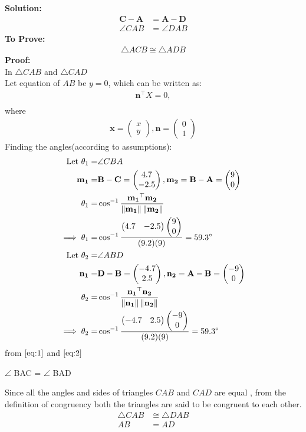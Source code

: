 \documentclass{article}
\providecommand{\norm}[1]{\left\lVert#1\right\rVert}
\newcommand{\solution}{\noindent \textbf{Solution: }}
\newcommand{\myvec}[1]{\ensuremath{\begin{pmatrix}#1\end{pmatrix}}}
\let\vec\mathbf
\begin{document}
\solution
\begin{align}
	\vec{C}-\vec{A} &= \vec{A}-\vec{D}\\
	\angle{CAB} &= \angle{DAB}
\end{align}
\textbf{To Prove:}
	\begin{align}
		\triangle{ACB} \cong \triangle{ADB}
	\end{align}
\textbf{Proof:}\\
In $\triangle{CAB}$ and $\triangle{CAD}$\\
Let  equation of $AB$ be $y = 0$, which can be written as:
\begin{align}
\vec{n}^{\top}X = 0,\\
\end{align}
where
\begin{align}
\vec{x} = \myvec{x\\y},\vec{n} = \myvec{0\\1}
\end{align}
	Finding the angles(according to assumptions):
		\begin{align}
\text{Let }\theta_1=&\angle CBA\\
\vec{m_1}=&\vec{B}-\vec{C}=\myvec{4.7\\-2.5}, \vec{m_2}=\vec{B}-\vec{A}=\myvec{9\\0}\\
\theta_1=&\cos^{-1}\frac{\vec{m_1}^\top\vec{m_2}}{\norm{\vec{m_1}}\norm{\vec{m_2}}}\\
\implies\theta_1=&\cos^{-1}\frac{\myvec{4.7&-2.5}\myvec{9\\0}}{(9.2)(9)}=59.3\degree
\label{eq:1}\\
\text{Let }\theta_2=&\angle ABD\\
\vec{n_1}=&\vec{D}-\vec{B}=\myvec{-4.7\\2.5}, \vec{n_2}=\vec{A}-\vec{B}=\myvec{-9\\0}\\
\theta_2 =& \cos^{-1}\frac{\vec{n_1}^\top\vec{n_2}}{\norm{\vec{n_1}}\norm{\vec{n_2}}}\\
\implies\theta_2=&\cos^{-1}\frac{\myvec{-4.7&2.5}\myvec{-9\\0}}{(9.2)(9)}=59.3\degree
\label{eq:2}\\
\end{align}
from $\eqref{eq:1}$ and $\eqref{eq:2}$
\begin{center}
$\angle$ BAC = $\angle$ BAD 
\end{center}
Since all the angles and sides of triangles $CAB$ and $CAD$ are equal , from the definition of congruency both the triangles are said to be congruent to each other.
\begin{align}
	\triangle{CAB} &\cong \triangle{DAB}\\
	AB &= AD 
\end{align}
\end{document}
